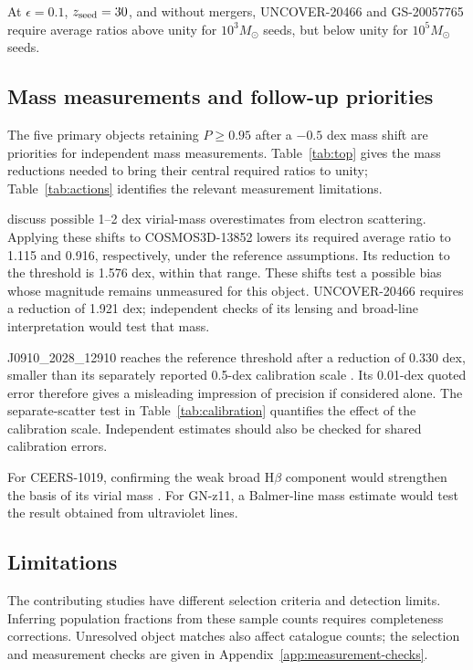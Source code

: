 \documentclass[pdflatex,sn-basic]{sn-jnl}
\begin{document}
At $\epsilon=0.1$, $z_{\rm seed}=30$, and without mergers, UNCOVER-20466
and GS-20057765 require average ratios above unity for $10^3M_\odot$ seeds,
but below unity for $10^5M_\odot$ seeds.

\subsection{Mass measurements and follow-up priorities}
\label{sec:credibility}

The five primary objects retaining $P\geq0.95$ after a $-0.5$ dex mass shift
are priorities for independent mass measurements. Table~\ref{tab:top}
gives the mass reductions needed to bring their central required ratios
to unity; Table~\ref{tab:actions} identifies the relevant measurement limitations.


\citet{lin2025} discuss possible 1--2 dex virial-mass overestimates from
electron scattering. Applying these shifts to COSMOS3D-13852 lowers its
required average ratio to 1.115 and 0.916, respectively, under the reference
assumptions. Its reduction to the threshold is 1.576 dex, within that range.
These shifts test a possible bias whose magnitude remains unmeasured for
this object. UNCOVER-20466 requires a reduction of 1.921 dex; independent
checks of its lensing and broad-line interpretation would test that mass.

J0910\_2028\_12910 reaches the reference threshold after a reduction of
0.330 dex, smaller than its separately reported 0.5-dex calibration scale
\citep{baccus2026}. Its 0.01-dex quoted error therefore gives a misleading
impression of precision if considered alone. The separate-scatter test in
Table~\ref{tab:calibration} quantifies the effect of the calibration scale.
Independent estimates should also be checked for shared calibration errors.

For CEERS-1019, confirming the weak broad H$\beta$ component would strengthen
the basis of its virial mass \citep{larson2023}. For GN-z11, a Balmer-line
mass estimate would test the result obtained from ultraviolet lines.

\subsection{Limitations}
\label{sec:limits}

The contributing studies have different selection criteria and detection
limits. Inferring population fractions from these sample counts requires
completeness corrections. Unresolved object matches also affect catalogue
counts; the selection and measurement checks are given in
Appendix~\ref{app:measurement-checks}.
\end{document}
